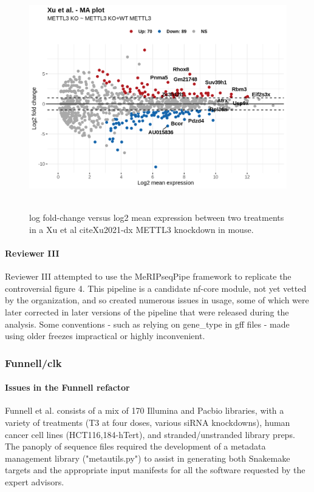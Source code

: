 \documentclass{drexelthesis}
\begin{document}
\begin{figure}[h!]
	\centering
\includegraphics[width=13.76cm,height=9.78cm]{./images/ma6.png}
\caption{log fold-change versus log2 mean expression between two treatments in a Xu et al cite{Xu2021-dx} METTL3 knockdown in mouse.}
\end{figure}

\paragraph{Reviewer III}

Reviewer III attempted to use the MeRIPseqPipe framework to replicate the controversial figure 4. This pipeline is a candidate nf-core module, not yet vetted by the organization, and so created numerous issues in usage, some of which were later corrected in later versions of the pipeline that were released during the analysis. Some conventions - such as relying on gene\_type in gff files - made using older freezes impractical or highly inconvenient.

\subsubsection{Funnell/clk}

\paragraph{Issues in the Funnell refactor}

Funnell et al. consists of a mix of 170 Illumina and Pacbio libraries, with a variety of treatments (T3 at four doses, various siRNA knockdowns), human cancer cell lines (HCT116,184-hTert), and stranded/unstranded library preps. The panoply of sequence files required the development of a metadata management library ("metautils.py") to assist in generating both Snakemake targets and the appropriate input manifests for all the software requested by the expert advisors.
\end{document}
